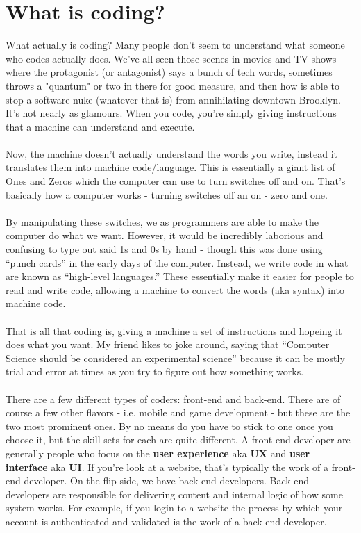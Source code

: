 \documentclass[12pt,a4paper]{book}
\begin{document}
	\chapter{What is coding?}  \label{chap:intro-coding}
		What actually is coding? Many people don't seem to understand what someone who  codes actually does. We've all seen those scenes in movies and TV shows where the protagonist (or antagonist) says a bunch of tech words, sometimes throws a "quantum" or two in there for good measure, and then how is able to stop a software nuke (whatever that is) from annihilating downtown Brooklyn. It's not nearly as glamours. When you code, you're simply giving instructions that a machine can understand and execute.
		\\\\
		Now, the machine doesn't actually understand the words you write, instead it translates them into machine code/language. This is essentially a giant list of Ones and Zeros which the computer can use to turn switches off and on. That's basically how a computer works - turning switches off an on - zero and one.
		\\\\
		By manipulating these switches, we as programmers are able to make the computer do what we want. However, it would be incredibly laborious and confusing to type out said 1s and 0s by hand - though this was done using ``punch cards'' in the early days of the computer. Instead, we write code in what are known as ``high-level languages.'' These essentially make it easier for people to read and write code, allowing a machine to convert the words (aka syntax) into machine code.
		\\\\
		That is all that coding is, giving a machine a set of instructions and hopeing it does what you want. My friend likes to joke around, saying that ``Computer Science should be considered an experimental science'' because it can be mostly trial and error at times as you try to figure out how something works. 
		\\\\
		There are a few different types of coders: front-end and back-end. There are of course a few other flavors - i.e. mobile and game development - but these are the two most prominent ones. By no means do you have to stick to one once you choose it, but the skill sets for each are quite different. A front-end developer are generally people who focus on the \textbf{user experience} aka \textbf{UX} and \textbf{user interface} aka \textbf{UI}. If you're look at a website, that's typically the work of a front-end developer. On the flip side, we have back-end developers. Back-end developers are responsible for delivering content and internal logic of how some system works. For example, if you login to a website the process by which your account is authenticated and validated is the work of a back-end developer.
\end{document}
